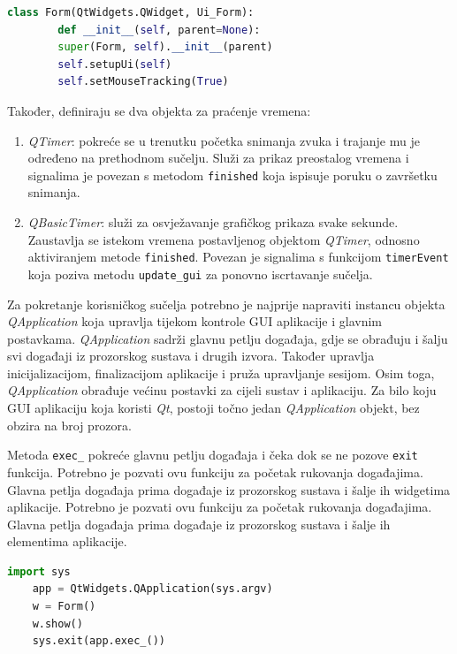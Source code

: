 \begin{lstlisting}[caption={Definicija klase \textit{Form} i njezin konstruktor}, language=Python]
	class Form(QtWidgets.QWidget, Ui_Form):
		def __init__(self, parent=None):
		super(Form, self).__init__(parent)
		self.setupUi(self)
		self.setMouseTracking(True)
\end{lstlisting}

Također, definiraju se dva objekta za praćenje vremena:
\begin{enumerate}
	\item \textit{QTimer}: pokreće se u trenutku početka snimanja zvuka i trajanje mu je određeno na prethodnom sučelju. Služi za prikaz preostalog vremena i signalima je povezan s metodom \lstinline|finished| koja ispisuje poruku o završetku snimanja.
	\item \textit{QBasicTimer}: služi za osvježavanje grafičkog prikaza svake sekunde. Zaustavlja se istekom vremena postavljenog objektom \textit{QTimer}, odnosno aktiviranjem metode \lstinline|finished|. Povezan je signalima s funkcijom \lstinline|timerEvent| koja poziva metodu \lstinline|update_gui| za ponovno iscrtavanje sučelja.
\end{enumerate}

Za pokretanje korisničkog sučelja potrebno je najprije napraviti instancu objekta \textit{QApplication} koja upravlja tijekom kontrole GUI aplikacije i glavnim postavkama. \textit{QApplication} sadrži glavnu petlju događaja, gdje se obrađuju i šalju svi događaji iz prozorskog sustava i drugih izvora. Također upravlja inicijalizacijom, finalizacijom aplikacije i pruža upravljanje sesijom. Osim toga, \textit{QApplication} obrađuje većinu postavki za cijeli sustav i aplikaciju. Za bilo koju GUI aplikaciju koja koristi \textit{Qt}, postoji točno jedan \textit{QApplication} objekt, bez obzira na broj prozora. 

Metoda \lstinline|exec_| pokreće glavnu petlju događaja i čeka dok se ne pozove \lstinline|exit| funkcija. Potrebno je pozvati ovu funkciju za početak rukovanja događajima. Glavna petlja događaja prima događaje iz prozorskog sustava i šalje ih widgetima aplikacije. Potrebno je pozvati ovu funkciju za početak rukovanja događajima. Glavna petlja događaja prima događaje iz prozorskog sustava i šalje ih elementima  aplikacije.

\begin{lstlisting}[caption={Naredbe za pokretanje korisničkog sučelja}, language=Python]
	import sys
	app = QtWidgets.QApplication(sys.argv)
	w = Form()
	w.show()
	sys.exit(app.exec_())
\end{lstlisting}


